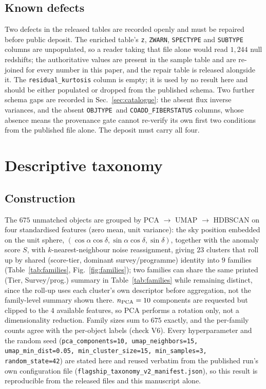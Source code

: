 \documentclass[aps,prd,twocolumn,superscriptaddress,nofootinbib,longbibliography,floatfix]{revtex4-2}
\newcommand{\ZWARN}{\texttt{ZWARN}}
\newcommand{\OBJTYPE}{\texttt{OBJTYPE}}
\begin{document}
\subsection{Known defects}
\label{sec:defects}
Two defects in the released tables are recorded openly and must be repaired
before public deposit. The enriched table's \texttt{z}, \ZWARN,
\texttt{SPECTYPE} and \texttt{SUBTYPE} columns are unpopulated, so a reader
taking that file alone would read $1{,}244$ null redshifts; the authoritative
values are present in the sample table and are re-joined for every number in
this paper, and the repair table is released alongside
it.
The \texttt{residual\_kurtosis} column is empty; it is used by no result
here and should be either populated or dropped from the published
schema.
Two further schema gaps are recorded in Sec.~\ref{sec:catalogue}: the absent
flux inverse variances, and the absent \OBJTYPE\ and
\texttt{COADD\_FIBERSTATUS} columns, whose absence means the provenance gate
cannot re-verify its own first two conditions from the published file alone.
The deposit must carry all four.

\section{Descriptive taxonomy}
\label{sec:taxonomy}

\subsection{Construction}
The $675$ unmatched objects are grouped by PCA $\to$ UMAP \cite{UMAP} $\to$
HDBSCAN \cite{HDBSCAN} on four standardised features (zero mean, unit
variance): the sky position embedded on the unit sphere,
$(\cos\alpha\cos\delta,\sin\alpha\cos\delta,\sin\delta)$, together with the
anomaly score $S$, with $k$-nearest-neighbour noise reassignment, giving
$23$ clusters that roll up by shared (score-tier, dominant survey/programme)
identity into $9$ families (Table~\ref{tab:families},
Fig.~\ref{fig:families}); two families can share the same printed
(Tier, Survey/prog.) summary in Table~\ref{tab:families} while remaining
distinct, since the roll-up uses each cluster's own descriptor before
aggregation, not the family-level summary shown there. $n_{\rm PCA}=10$
components are requested but clipped to the $4$ available features, so PCA
performs a rotation only, not a dimensionality reduction.
Family sizes sum to $675$ exactly, and the per-family counts agree with the
per-object labels (check V6). Every hyperparameter and the random seed
(\texttt{pca\_components=10, umap\_neighbors=15, umap\_min\_dist=0.05,
min\_cluster\_size=15, min\_samples=3, random\_state=42}) are stated here and
reused verbatim from the published run's own configuration file
(\texttt{flagship\_taxonomy\_v2\_manifest.json}), so this result is
reproducible from the released files and this manuscript alone.
\end{document}
